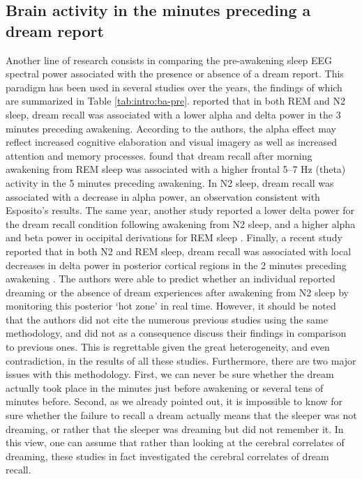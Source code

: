 \subsection{Brain activity in the minutes preceding a dream report}
\label{sec:dream-research:attempts:ba-pre}

Another line of research consists in comparing the pre-awakening sleep EEG spectral power associated with the presence or absence of a dream report. This paradigm has been used in several studies over the years, the findings of which are summarized in Table \ref{tab:intro:ba-pre}. \citet{esposito_reduced_2004} reported that in both REM and N2 sleep, dream recall was associated with a lower alpha and delta power in the 3 minutes preceding awakening. According to the authors, the alpha effect may reflect increased cognitive elaboration and visual imagery as well as increased attention and memory processes. \citet{marzano_recalling_2011} found that dream recall after morning awakening from REM sleep was associated with a higher frontal 5–7 Hz (theta) activity in the 5 minutes preceding awakening. In N2 sleep, dream recall was associated with a decrease in alpha power, an observation consistent with Esposito’s results. The same year, another study reported a lower delta power for the dream recall condition following awakening from N2 sleep, and a higher alpha and beta power in occipital derivations for REM sleep \citep{chellappa_cortical_2011}. Finally, a recent study reported that in both N2 and REM sleep, dream recall was associated with local decreases in delta power in posterior cortical regions in the 2 minutes preceding awakening \citep{siclari_neural_2017}. The authors were able to predict whether an individual reported dreaming or the absence of dream experiences after awakening from N2 sleep by monitoring this posterior ‘hot zone’ in real time. However, it should be noted that the authors did not cite the numerous previous studies using the same methodology, and did not as a consequence discuss their findings in comparison to previous ones. This is regrettable given the great heterogeneity, and even contradiction, in the results of all these studies. Furthermore, there are two major issues with this methodology. First, we can never be sure whether the dream actually took place in the minutes just before awakening or several tens of minutes before. Second, as we already pointed out, it is impossible to know for sure whether the failure to recall a dream actually means that the sleeper was not dreaming, or rather that the sleeper was dreaming but did not remember it. In this view, one can assume that rather than looking at the cerebral correlates of dreaming, these studies in fact investigated the cerebral correlates of dream recall.

